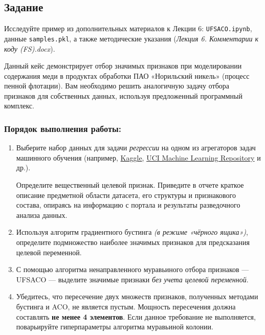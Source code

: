 \subsection{Задание}

Исследуйте пример из дополнительных материалов к Лекции 6: \texttt{UFSACO.ipynb}, данные \texttt{samples.pkl}, а также методические указания (\textit{Лекция 6. Комментарии к коду (FS).docx}). 

Данный кейс демонстрирует отбор значимых признаков при моделировании содержания меди в продуктах обработки ПАО «Норильский никель» (процесс пенной флотации). Вам необходимо решить аналогичную задачу отбора признаков для собственных данных, используя предложенный программный комплекс.

\subsubsection*{Порядок выполнения работы:}

\begin{enumerate}
    \item Выберите набор данных для задачи \textit{регрессии} на одном из агрегаторов задач машинного обучения (например, \href{https://www.kaggle.com/datasets}{Kaggle}, \href{https://archive.ics.uci.edu}{UCI Machine Learning Repository} и др.). 
    
    Определите вещественный целевой признак. Приведите в отчете краткое описание предметной области датасета, его структуры и признакового состава, опираясь на информацию с портала и результаты разведочного анализа данных.

    \item Используя алгоритм градиентного бустинга \textit{(в режиме «чёрного ящика»)}, определите подмножество наиболее значимых признаков для предсказания целевой переменной.

    \item С помощью алгоритма ненаправленного муравьиного отбора признаков --- UFSACO --- выделите значимые признаки \textit{без учета целевой переменной}. 
    
    \item Убедитесь, что пересечение двух множеств признаков, полученных методами бустинга и ACO, не является пустым. Мощность пересечения должна составлять \textbf{не менее 4 элементов}. Если данное требование не выполняется, поварьируйте гиперпараметры алгоритма муравьиной колонии.
\end{enumerate}

